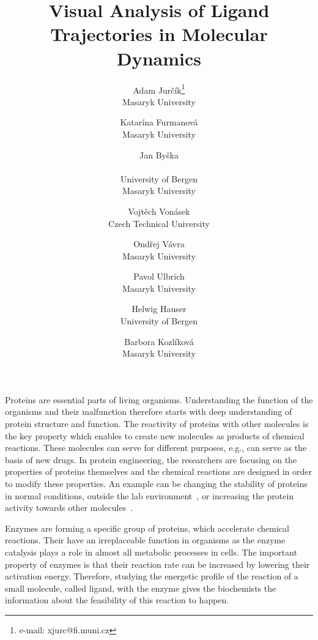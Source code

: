 \documentclass{vgtc}                          %
\title{Visual Analysis of Ligand Trajectories in Molecular Dynamics}
\author{Adam Jur\v{c}\'{i}k\thanks{e-mail: xjurc@fi.muni.cz}\\ %
        \scriptsize Masaryk University %
\and Katar\'{i}na Furmanov\'{a}\\ %
     \scriptsize Masaryk University %
\and Jan By\v{s}ka\\ %
     \parbox{1.4in}{\scriptsize \centering University of Bergen \\ Masaryk University} %
\and Vojt\v{e}ch Von\'{a}sek\\ %
     \scriptsize Czech Technical University %
\vspace{\baselineskip} %
\and Ond\v{r}ej V\'{a}vra\\ %
     \scriptsize Masaryk University %
\and Pavol Ulbrich\\ %
     \scriptsize Masaryk University
\and Helwig Hauser\\ %
     \scriptsize University of Bergen %
\and Barbora Kozl\'{i}kov\'{a}\\ %
     \scriptsize Masaryk University}
\begin{document}


\maketitle


Proteins are essential parts of living organisms. 
Understanding the function of the organisms and their malfunction therefore starts with deep understanding of protein structure and function.
The reactivity of proteins with other molecules is the key property which enables to create new molecules as products of chemical reactions. 
These molecules can serve for different purposes, e.g., can serve as the basis of new drugs. 
In protein engineering, the researchers are focusing on the properties of proteins themselves and the chemical reactions are designed in order to modify these properties. 
An example can be changing the stability of proteins in normal conditions, outside the lab environment~\cite{koudelakova}, or increasing the protein activity towards other molecules~\cite{pavlova}.

Enzymes are forming a specific group of proteins, which accelerate chemical reactions. 
Their have an irreplaceable function in organisms as the enzyme catalysis plays a role in almost all metabolic processes in cells.
The important property of enzymes is that their reaction rate can be increased by lowering their activation energy.
Therefore, studying the energetic profile of the reaction of a small molecule, called ligand, with the enzyme gives the biochemists the information about the feasibility of this reaction to happen.
\end{document}

